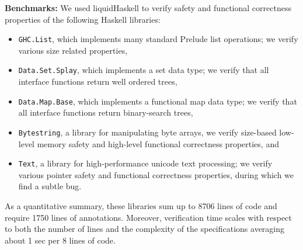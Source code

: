 \textbf{Benchmarks:}
We used liquidHaskell to verify safety and functional correctness properties of the following Haskell libraries:

\begin{itemize}
\item \texttt{GHC.List}, which implements many standard Prelude list
operations; we verify various size related properties,
\item \texttt{Data.Set.Splay}, which implements a set data type; 
we verify that all interface functions return well ordered trees,
\item \texttt{Data.Map.Base}, which implements a functional map data
type; we verify that all interface functions return
binary-search trees,
\item \texttt{Bytestring}, a library for manipulating byte arrays, we 
verify size-based low-level memory safety and high-level 
functional correctness properties, and
\item \texttt{Text}, a library for high-performance unicode text processing; 
we verify various pointer safety and functional correctness
properties, during which we find a subtle bug.
\end{itemize}

As a quantitative summary, 
these libraries sum up to 8706 lines of code and require 
1750 lines of annotations.
Moreover, verification time scales
with respect to both the number of lines 
and the complexity of the specifications
averaging about 1 sec per 8 lines of code.

